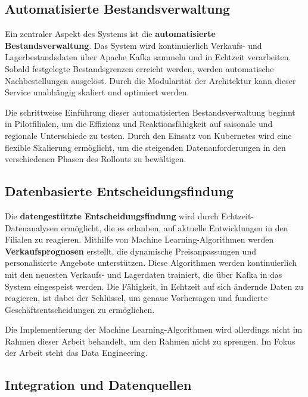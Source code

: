 \documentclass[%
pdftex,
oneside,			%
11pt,				%
parskip=half,		%
headheight = 12pt,	%
headsepline,		%
footsepline,		%
footheight = 16pt,	%
abstracton,		%
DIV=calc,		%
BCOR=8mm,		%
headinclude=false,	%
footinclude=false,	%
listof=totoc,		%
toc=bibliography,	%
]{scrreprt}	%
\begin{document}
    \subsection{Automatisierte Bestandsverwaltung}

        Ein zentraler Aspekt des Systems ist die \textbf{automatisierte Bestandsverwaltung}. 
        Das System wird kontinuierlich Verkaufs- und Lagerbestandsdaten über Apache Kafka sammeln und in Echtzeit verarbeiten. 
        Sobald festgelegte Bestandsgrenzen erreicht werden, werden automatische Nachbestellungen ausgelöst. 
        Durch die Modularität der Architektur kann dieser Service unabhängig skaliert und optimiert werden.

        Die schrittweise Einführung dieser automatisierten Bestandsverwaltung beginnt in Pilotfilialen, um die Effizienz und Reaktionsfähigkeit auf saisonale und regionale Unterschiede zu testen. 
        Durch den Einsatz von Kubernetes wird eine flexible Skalierung ermöglicht, um die steigenden Datenanforderungen in den verschiedenen Phasen des Rollouts zu bewältigen.

    \subsection{Datenbasierte Entscheidungsfindung}

        Die \textbf{datengestützte Entscheidungsfindung} wird durch Echtzeit-Datenanalysen ermöglicht, die es erlauben, auf aktuelle Entwicklungen in den Filialen zu reagieren. 
        Mithilfe von Machine Learning-Algorithmen werden \textbf{Verkaufsprognosen} erstellt, die dynamische Preisanpassungen und personalisierte Angebote unterstützen.
        Diese Algorithmen werden kontinuierlich mit den neuesten Verkaufs- und Lagerdaten trainiert, die über Kafka in das System eingespeist werden. 
        Die Fähigkeit, in Echtzeit auf sich ändernde Daten zu reagieren, ist dabei der Schlüssel, um genaue Vorhersagen und fundierte Geschäftsentscheidungen zu ermöglichen.

        Die Implementierung der Machine Learning-Algorithmen wird allerdings nicht im Rahmen dieser Arbeit behandelt, um den Rahmen nicht zu sprengen.
        Im Fokus der Arbeit steht das Data Engineering.


    \subsection{Integration und Datenquellen}
\end{document}
